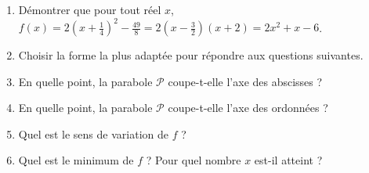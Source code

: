 
\begin{enumerate}
\item Démontrer que pour tout réel $x$,
$f(x)=2(x + \frac{1}{4})^2 - \frac{49}{8}=2\left(x - \frac{3}{2} \right)(x+2)=2 x^2+x-6$.
\item Choisir la forme la plus adaptée pour répondre aux questions suivantes.
\item  En quelle point, la parabole $\mathscr{P}$ coupe-t-elle l'axe des abscisses ?
\item  En quelle point, la parabole $\mathscr{P}$  coupe-t-elle l'axe des ordonnées ?
\item  Quel est le sens de variation de $f$ ?
\item  Quel est le minimum de $f$ ? Pour quel nombre $x$ est-il atteint ?
\end{enumerate}

